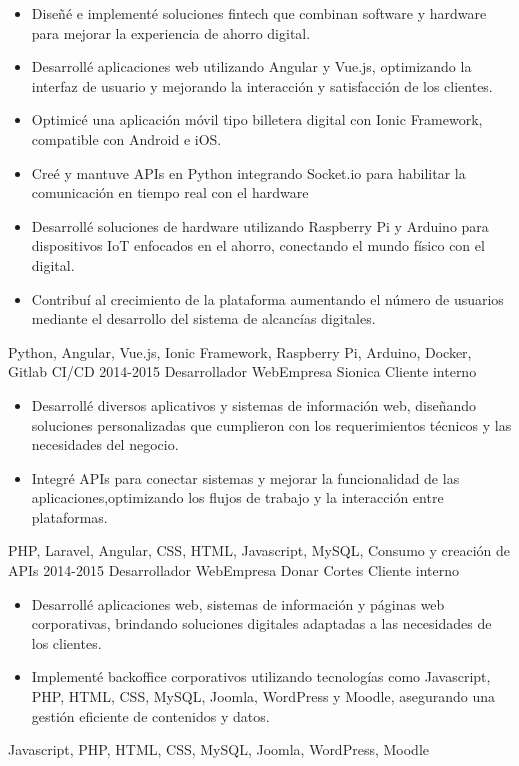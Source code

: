 \begin{experiences}
{          \begin{itemize}
              \item Diseñé e implementé soluciones fintech que combinan software y hardware para mejorar la experiencia de ahorro digital.
              \item Desarrollé aplicaciones web utilizando Angular y Vue.js, optimizando la interfaz de usuario y mejorando la interacción y satisfacción de los clientes.
              \item Optimicé una aplicación móvil tipo billetera digital con Ionic Framework, compatible con Android e iOS.
              \item Creé y mantuve APIs en Python integrando Socket.io para habilitar la comunicación en tiempo real con el hardware
              \item Desarrollé soluciones de hardware utilizando Raspberry Pi y Arduino para dispositivos IoT enfocados en el ahorro, conectando el mundo físico con el digital.
              \item Contribuí al crecimiento de la plataforma aumentando el número de usuarios mediante el desarrollo del sistema de alcancías digitales.
            \end{itemize}
        }
        {
          Python, Angular, Vue.js, Ionic Framework, Raspberry Pi, Arduino, Docker, Gitlab CI/CD
        }
  \emptySeparator
  \experience
    {2014-2015} {Desarrollador Web}{Empresa Sionica} {Cliente interno}
    {} {
        \begin{itemize}
          \item Desarrollé diversos aplicativos y sistemas de información web, diseñando soluciones personalizadas que cumplieron con los requerimientos técnicos y las necesidades del negocio.
          \item Integré APIs para conectar sistemas y mejorar la funcionalidad de las aplicaciones,optimizando los flujos de trabajo y la interacción entre plataformas.
        \end{itemize}
      }
      {PHP, Laravel, Angular, CSS, HTML, Javascript, MySQL, Consumo y creación de APIs}
  \emptySeparator
  \experience
    {2014-2015} {Desarrollador Web}{Empresa Donar Cortes} {Cliente interno}
    {} {
        \begin{itemize}
          \item Desarrollé aplicaciones web, sistemas de información y páginas web corporativas, brindando soluciones digitales adaptadas a las necesidades de los clientes.
          \item Implementé backoffice corporativos utilizando tecnologías como Javascript, PHP, HTML, CSS, MySQL, Joomla, WordPress y Moodle, asegurando una gestión eficiente de contenidos y datos.
        \end{itemize}
      }
      {Javascript, PHP, HTML, CSS, MySQL, Joomla, WordPress, Moodle}
  \emptySeparator


\end{experiences}
